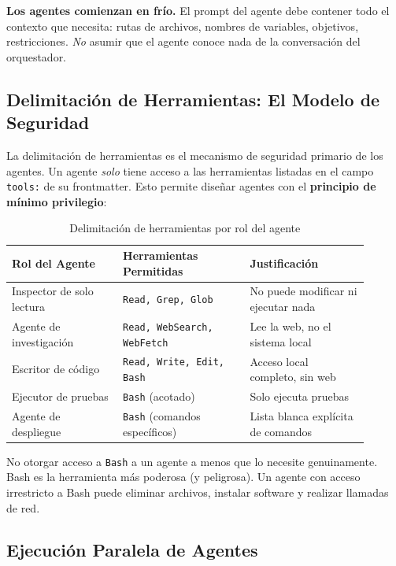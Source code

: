 \documentclass[11pt,letterpaper]{article}
\begin{document}
\begin{notebox}
\textbf{Los agentes comienzan en frío.} El prompt del agente debe contener todo el contexto que necesita: rutas de archivos, nombres de variables, objetivos, restricciones. \emph{No} asumir que el agente conoce nada de la conversación del orquestador.
\end{notebox}

\subsection{Delimitación de Herramientas: El Modelo de Seguridad}

La delimitación de herramientas es el mecanismo de seguridad primario de los agentes. Un agente \emph{solo} tiene acceso a las herramientas listadas en el campo \texttt{tools:} de su frontmatter. Esto permite diseñar agentes con el \textbf{principio de mínimo privilegio}:

\begin{table}[H]
\centering
\caption{Delimitación de herramientas por rol del agente}
\begin{tabular}{@{}p{0.28\linewidth}p{0.32\linewidth}p{0.30\linewidth}@{}}
\toprule
\textbf{Rol del Agente} & \textbf{Herramientas Permitidas} & \textbf{Justificación} \\
\midrule
Inspector de solo lectura & \texttt{Read, Grep, Glob} & No puede modificar ni ejecutar nada \\
Agente de investigación & \texttt{Read, WebSearch, WebFetch} & Lee la web, no el sistema local \\
Escritor de código & \texttt{Read, Write, Edit, Bash} & Acceso local completo, sin web \\
Ejecutor de pruebas & \texttt{Bash} (acotado) & Solo ejecuta pruebas \\
Agente de despliegue & \texttt{Bash} (comandos específicos) & Lista blanca explícita de comandos \\
\bottomrule
\end{tabular}
\end{table}

\begin{warningbox}
No otorgar acceso a \texttt{Bash} a un agente a menos que lo necesite genuinamente. Bash es la herramienta más poderosa (y peligrosa). Un agente con acceso irrestricto a Bash puede eliminar archivos, instalar software y realizar llamadas de red.
\end{warningbox}

\subsection{Ejecución Paralela de Agentes}
\end{document}
